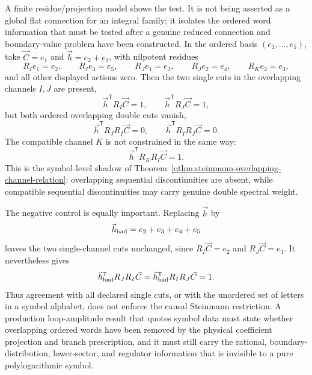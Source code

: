 \begin{construction}
A finite residue/projection model shows the test.  It is not being asserted as
a global flat connection for an integral family; it isolates the ordered word
information that must be tested after a genuine reduced connection and
boundary-value problem have been constructed.  In the ordered basis
\((e_1,\ldots,e_5)\), take \(\vec C=e_1\) and
\(\vec h=e_2+e_3\), with nilpotent residues
\[
  R_I e_1=e_2,\qquad R_I e_3=e_5,\qquad
  R_J e_1=e_3,\qquad R_J e_2=e_4,\qquad
  R_K e_2=e_3,
\]
and all other displayed actions zero.  Then the two single cuts in the
overlapping channels \(I,J\) are present,
\[
  \vec h^{\mathsf T}R_I\vec C=1,
  \qquad
  \vec h^{\mathsf T}R_J\vec C=1,
\]
but both ordered overlapping double cuts vanish,
\begin{equation}
  \vec h^{\mathsf T}R_JR_I\vec C=0,
  \qquad
  \vec h^{\mathsf T}R_IR_J\vec C=0 .
  \label{eq:symbol-steinmann-overlap-zero-model}
\end{equation}
The compatible channel \(K\) is not constrained in the same way:
\[
  \vec h^{\mathsf T}R_KR_I\vec C=1 .
\]
This is the symbol-level shadow of
Theorem~\ref{qthm:steinmann-overlapping-channel-relation}: overlapping
sequential discontinuities are absent, while compatible sequential
discontinuities may carry genuine double spectral weight.

The negative control is equally important.  Replacing
\(\vec h\) by
\[
  \vec h_{\rm bad}=e_2+e_3+e_4+e_5
\]
leaves the two single-channel cuts unchanged, since \(R_I\vec C=e_2\) and
\(R_J\vec C=e_3\).  It nevertheless gives
\[
  \vec h_{\rm bad}^{\mathsf T}R_JR_I\vec C
  =
  \vec h_{\rm bad}^{\mathsf T}R_IR_J\vec C
  =
  1 .
\]
Thus agreement with all declared single cuts, or with the unordered set of
letters in a symbol alphabet, does not enforce the causal Steinmann
restriction.  A production loop-amplitude result that quotes symbol data must
state whether overlapping ordered words have been removed by the physical
coefficient projection and branch prescription, and it must still carry the
rational, boundary-distribution, lower-sector, and regulator information that
is invisible to a pure polylogarithmic symbol.
\end{construction}

